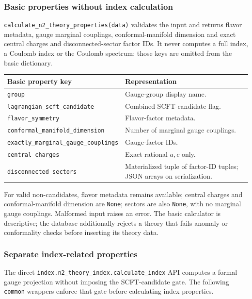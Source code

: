 \documentclass[11pt,a4paper]{article}
\numberwithin{equation}{section}
\newcommand{\code}[1]{{\small\nolinkurl{#1}}}
\begin{document}
\subsubsection{Basic properties without index calculation}
\code{calculate_n2_theory_properties(data)} validates the input and returns
flavor metadata, gauge marginal couplings, conformal-manifold dimension and
exact central charges and disconnected-sector factor IDs. It never computes a full index, a Coulomb index or the
Coulomb spectrum; those keys are omitted from the basic dictionary.
\begin{tabularx}{\textwidth}{@{}Y>{\raggedright\arraybackslash}p{59mm}@{}}
\toprule Basic property key & Representation\\\midrule
\code{group} & Gauge-group display name.\\
\code{lagrangian_scft_candidate} & Combined SCFT-candidate flag.\\
\code{flavor_symmetry} & Flavor-factor metadata.\\
\code{conformal_manifold_dimension} & Number of marginal gauge couplings.\\
\code{exactly_marginal_gauge_couplings} & Gauge-factor IDs.\\
\code{central_charges} & Exact rational $a,c$ only.\\
\code{disconnected_sectors} & Materialized tuple of factor-ID tuples; JSON arrays on serialization.\\\bottomrule
\end{tabularx}
For valid non-candidates, flavor metadata remains available; central charges
and conformal-manifold dimension are \code{None}; sectors are also \code{None}, with no marginal gauge
couplings. Malformed input raises an error. The basic calculator is descriptive;
the database additionally rejects a theory that fails anomaly or conformality
checks before inserting its theory data.

\clearpage
\subsubsection{Separate index-related properties}
The direct \code{index.n2_theory_index.calculate_index} API computes a formal
gauge projection without imposing the SCFT-candidate gate. The following
\code{common} wrappers enforce that gate before calculating index properties.
\end{document}
